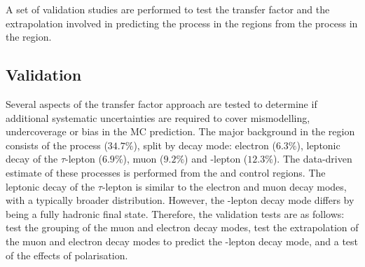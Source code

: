 A set of validation studies are performed to test the transfer factor and the
extrapolation involved in predicting the \IWj process in the \metplusjets
regions from the \IWj process in the \ellplusjets region.


\subsection{Validation}

Several aspects of the transfer factor approach are tested to determine if
additional systematic uncertainties are required to cover mismodelling,
undercoverage or bias in the MC prediction. The major background in the
\metplusjets region consists of the \IWj process ($34.7\%$), split by decay
mode: electron ($6.3\%$), leptonic decay of the $\tau$-lepton ($6.9\%$), muon
($9.2\%$) and \Ptauh-lepton ($12.3\%$). The data-driven estimate of these
processes is performed from the \muplusjets and \eleplusjets control regions.
The leptonic decay of the $\tau$-lepton is similar to the electron and muon
decay modes, with a typically broader \recoil distribution. However, the
\Ptauh-lepton decay mode differs by being a fully hadronic final state.
Therefore, the validation tests are as follows: test the grouping of the muon
and electron decay modes, test the extrapolation of the muon and electron
decay modes to predict the \Ptauh-lepton decay mode, and a test of the effects
of \PW polarisation.


